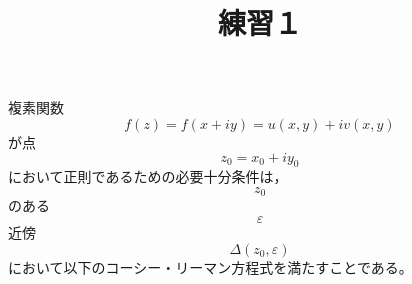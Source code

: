 \documentclass[a4]{jsarticle}
\begin{document}
\title{練習１}

複素関数\[f(z)=f(x+iy)=u(x,y)+iv(x,y)\]が点\[z_0=x_0+iy_0\]において正則であるための必要十分条件は，\[z_0\]のある\[ε\]近傍\[Δ(z_0,ε)\]において以下のコーシー・リーマン方程式を満たすことである。
\end{document}
